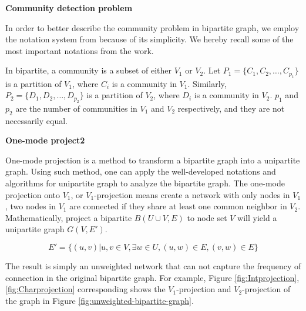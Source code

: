 \textbf{Community detection problem}

In order to better describe the community problem in bipartite graph,
we employ the notation system from \parencite{pesantez2018} because of its simplicity.
We hereby recall some of the most important notations from the work.

In bipartite, a community is a subset of either $V_1$ or $V_2$.
Let $P_1 = \{C_1, C_2, \ldots, C_{p_1}\}$ is a partition of $V_1$,
where $C_i$ is a community in $V_1$.
Similarly, $P_2 = \{D_1, D_2, \ldots, D_{p_2}\}$ is a partition of $V_2$,
where $D_i$ is a community in $V_2$.
$p_1$ and $p_2$ are the number of communities in $V_1$ and $V_2$ respectively,
and they are not necessarily equal.


\textbf{One-mode \gls{project2}}

One-mode projection is a method to transform a bipartite graph into a unipartite graph.
Using such method, one can apply the well-developed notations and algorithms for unipartite graph to analyze the bipartite graph.
The one-mode projection onto $V_1$, or $V_1$-projection means create a network with only nodes in $V_1$,
two nodes in $V_1$ are connected if they share at least one common neighbor in $V_2$.
Mathematically, project a bipartite $B(U\cup V, E)$ to node set $V$
will yield a unipartite graph $G(V, E')$.

\begin{equation*}
	E' = \{(u, v) | u, v \in V, \exists w \in U, (u, w) \in E, (v, w) \in E\}
\end{equation*}

The result is simply an unweighted network that can not capture the frequency of connection in the original bipartite graph.
For example, Figure \ref{fig:Intprojection}, \ref{fig:Charprojection} corresponding shows the $V_1$-projection and $V_2$-projection of the graph in Figure \ref{fig:unweighted-bipartite-graph}.

